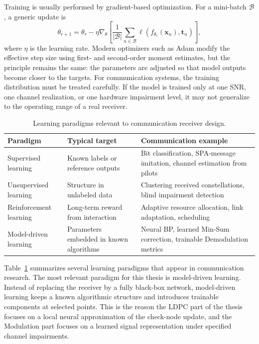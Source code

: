 Training is usually performed by gradient-based optimization. For a mini-batch $\mathcal{B}$, a generic update is
\begin{equation}
\label{eq:gradient_update_ch1}
\theta_{r+1}=\theta_r-\eta\nabla_{\theta}
\left[\frac{1}{|\mathcal{B}|}\sum_{n\in\mathcal{B}}
\ell\!\left(f_{\theta_r}(\mathbf{x}_n),\mathbf{t}_n\right)\right],
\end{equation}
where $\eta$ is the learning rate. Modern optimizers such as Adam modify the effective step size using first- and second-order moment estimates, but the principle remains the same: the parameters are adjusted so that model outputs become closer to the targets. For communication systems, the training distribution must be treated carefully. If the model is trained only at one SNR, one channel realization, or one hardware impairment level, it may not generalize to the operating range of a real receiver.

\begin{table}[H]
\centering
\caption{Learning paradigms relevant to communication receiver design.}
\label{tab:learning_paradigms}
\begin{tabularx}{\textwidth}{>{\raggedright\arraybackslash}p{}>{\raggedright\arraybackslash}p{}>{\raggedright\arraybackslash}X}
\toprule
Paradigm & Typical target & Communication example\\
\midrule
Supervised learning & Known labels or reference outputs & Bit classification, SPA-message imitation, channel estimation from pilots\\
Unsupervised learning & Structure in unlabeled data & Clustering received constellations, blind impairment detection\\
Reinforcement learning & Long-term reward from interaction & Adaptive resource allocation, link adaptation, scheduling\\
Model-driven learning & Parameters embedded in known algorithms & Neural BP, learned Min-Sum correction, trainable Demodulation metrics\\
\bottomrule
\end{tabularx}
\end{table}

Table~\ref{tab:learning_paradigms} summarizes several learning paradigms that appear in communication research. The most relevant paradigm for this thesis is model-driven learning. Instead of replacing the receiver by a fully black-box network, model-driven learning keeps a known algorithmic structure and introduces trainable components at selected points. This is the reason the LDPC part of the thesis focuses on a local neural approximation of the check-node update, and the Modulation part focuses on a learned signal representation under specified channel impairments.

